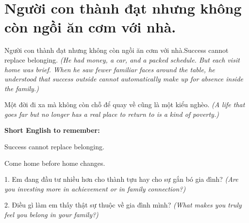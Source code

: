 \section{Người con thành đạt nhưng không còn ngồi ăn cơm với nhà.}
\begin{truyen}{Người con thành đạt nhưng không còn ngồi ăn cơm với nhà.}{Success cannot replace belonging.}
\textit{(He had money, a car, and a packed schedule. But each visit home was brief. When he saw fewer familiar faces around the table, he understood that success outside cannot automatically make up for absence inside the family.)}
\end{truyen}
\begin{baihoc}
Một đời đi xa mà không còn chỗ để quay về cũng là một kiểu nghèo.
\textit{(A life that goes far but no longer has a real place to return to is a kind of poverty.)}
\end{baihoc}
\begin{ghinhoanh}
\textbf{Short English to remember:}

Success cannot replace belonging.

Come home before home changes.
\end{ghinhoanh}
\begin{tuhocnhanh}
1. Em đang đầu tư nhiều hơn cho thành tựu hay cho sự gắn bó gia đình? \textit{(Are you investing more in achievement or in family connection?)}

2. Điều gì làm em thấy thật sự thuộc về gia đình mình? \textit{(What makes you truly feel you belong in your family?)}
\end{tuhocnhanh}
\ngancach